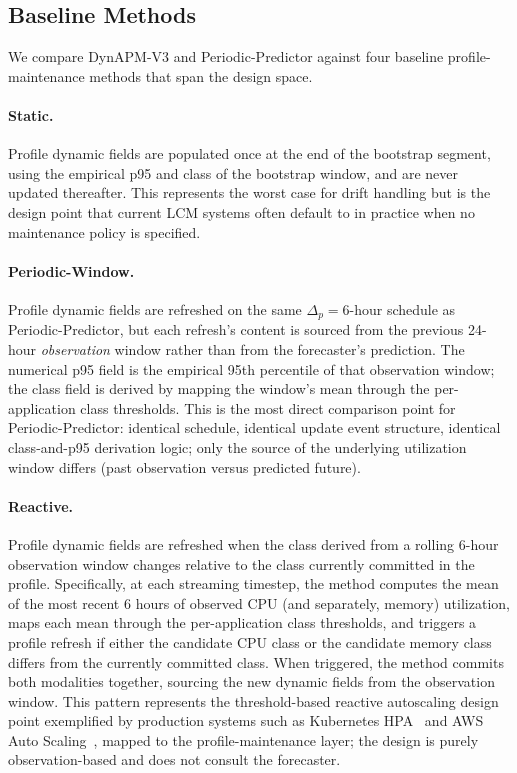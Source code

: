 \documentclass[manuscript,screen,review,anonymous]{acmart}
\begin{document}
\subsection{Baseline Methods}\label{sec:framework-baselines}

We compare DynAPM-V3 and Periodic-Predictor against four baseline
profile-maintenance methods that span the design space.

\paragraph{Static.} Profile dynamic fields are populated once at the
end of the bootstrap segment, using the empirical p95 and class of
the bootstrap window, and are never updated thereafter. This
represents the worst case for drift handling but is the design
point that current LCM systems often default to in practice when
no maintenance policy is specified.

\paragraph{Periodic-Window.} Profile dynamic fields are refreshed on
the same $\Delta_p = 6$-hour schedule as Periodic-Predictor, but
each refresh's content is sourced from the previous 24-hour
\emph{observation} window rather than from the forecaster's
prediction. The numerical p95 field is the empirical 95th
percentile of that observation window; the class field is derived
by mapping the window's mean through the per-application class
thresholds. This is the most direct comparison point for
Periodic-Predictor: identical schedule, identical update event
structure, identical class-and-p95 derivation logic; only the
source of the underlying utilization window differs (past
observation versus predicted future).

\paragraph{Reactive.} Profile dynamic fields are refreshed when the
class derived from a rolling 6-hour observation window changes
relative to the class currently committed in the profile.
Specifically, at each streaming timestep, the method computes the
mean of the most recent 6 hours of observed CPU (and separately,
memory) utilization, maps each mean through the per-application
class thresholds, and triggers a profile refresh if either the
candidate CPU class or the candidate memory class differs from the
currently committed class. When triggered, the method commits both
modalities together, sourcing the new dynamic fields from the
observation window. This pattern represents the threshold-based
reactive autoscaling design point exemplified by production
systems such as Kubernetes HPA~\cite{kubernetes_hpa} and AWS Auto
Scaling~\cite{aws_autoscaling}, mapped to the
profile-maintenance layer; the design is purely observation-based
and does not consult the forecaster.
\end{document}
